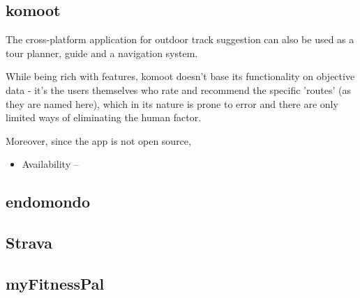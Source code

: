 \subsection{komoot}
The cross-platform application for outdoor track suggestion can also be used as a tour planner, guide and a navigation system.

While being rich with features, komoot doesn't base its functionality on objective data - it's the users themselves who rate and recommend the specific 'routes' (as they are named here),
which in its nature  is prone to error and there are only limited ways of eliminating the human factor.

Moreover, since the app is not open source, 

\begin{itemize}
    \item Availability --
\end{itemize}

\subsection{endomondo}

\subsection{Strava}

\subsection{myFitnessPal}